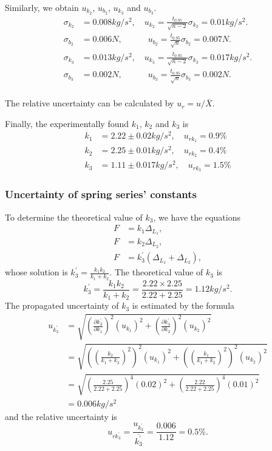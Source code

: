     Similarly, we obtain $u_{k_2}$, $u_{b_2}$, $u_{k_3}$ and $u_{b_3}$.
    \[
    \begin{split}
        \sigma_{k_2}&=0.008kg/s^2,\quad
        u_{k_2}=\frac{t_{0.95}}{\sqrt{n-2}}\sigma_{k_2}=0.01kg/s^2.\\
        \sigma_{b_2}&=0.006N,\quad\quad\quad
        u_{b_2}=\frac{t_{0.95}}{\sqrt{n}}\sigma_{b_2}=0.007N.\\
        \sigma_{k_3}&=0.013kg/s^2,\quad
        u_{k_3}=\frac{t_{0.95}}{\sqrt{n-2}}\sigma_{k_3}=0.017kg/s^2.\\
        \sigma_{b_3}&=0.002N,\quad\quad\quad
        u_{b_3}=\frac{t_{0.95}}{\sqrt{n}}\sigma_{b_3}=0.002N.\\
    \end{split}
    \]
    
    The relative uncertainty can be calculated by $u_r=u/\bar{X}$.

    Finally, the experimentally found $k_1$, $k_2$ and $k_3$ is
    \[
    \begin{split}
        k_1&= 2.22\pm 0.02 kg/s^2,\quad u_{rk_1}=0.9\%\\
        k_2&= 2.25\pm 0.01 kg/s^2,\quad u_{rk_2}=0.4\%\\
        k_3&= 1.11\pm 0.017kg/s^2,\quad u_{rk_3}=1.5\%
    \end{split}
    \]

\subsubsection{Uncertainty of spring series' constants}
    To determine the theoretical value of $k_3$, we have the equations
    \[
    \begin{split}
        F&=k_1\Delta_{L_1},\\
        F&=k_2\Delta_{L_2},\\
        F&=k_3^{'}(\Delta_{L_1}+\Delta_{L_2}),
    \end{split}
    \]
    whose solution is $k_3^{'}=\frac{k_1k_2}{k_1+k_2}$. The theoretical value of $k_3$ is
    \[
        k_3^{'}=\frac{k_1k_2}{k_1+k_2}=\frac{2.22\times2.25}{2.22+2.25}=1.12kg/s^2.
    \]
    The propagated uncertainty of $k_3$ is estimated by the formula
    \[
    \begin{split}
        u_{k_3^{'}}&=\sqrt{(\frac{\partial k_3^{'}}{\partial k_1})^2(u_{k_1})^2+(\frac{\partial k_3^{'}}{\partial k_2})^2(u_{k_2})^2}\\[0.3cm]
        &=\sqrt{((\frac{k_2}{k_1+k_2})^2)^2(u_{k_1})^2+((\frac{k_1}{k_1+k_2})^2)^2(u_{k_2})^2}\\[0.3cm]
        &=\sqrt{(\frac{2.25}{2.22+2.25})^4(0.02)^2+(\frac{2.22}{2.22+2.25})^4(0.01)^2}\\[0.3cm]
        &=0.006kg/s^2
    \end{split}
    \]
    and the relative uncertainty is
    \[
        u_{rk_3^{'}}=\frac{u_{k_3^{'}}}{\overline{k_3^{'}}}=\frac{0.006}{1.12}=0.5\%.
    \]

